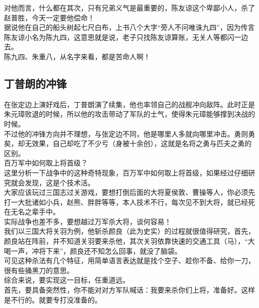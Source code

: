 \begin{multicols}{\theparacolNo}
对他而言，什么都在其次，只有兄弟义气是最重要的，陈友谅这个卑鄙小人，杀了赵普胜，今天一定要他偿命！\\

据说他在自己的船头树起七尺白布，上书八个大字“旁人不问唯诛九四”，因为传言陈友谅小名为陈九四，这意思就是说，老子只找陈友谅算账，无关人等都闪一边去。\\

陈九四、朱重八，从名字来看，都是苦命人啊！\\

\subsection{丁普朗的冲锋}
在张定边上演好戏后，丁普朗演了续集，他也率领自己的战舰冲向敌阵。此时正是朱元璋败退的时候，所以他的攻击带动了军队的士气，使得朱元璋能够撑到决战的时候。\\

不过他的冲锋方向并不理想，与张定边不同，他是哪里人多就向哪里冲击。勇则勇矣，却无效果，自己却吃了不少亏（身被十余创），这就是名将之勇与匹夫之勇的区别。\\

百万军中如何取上将首级？\\

这里分析一下战争中的这种奇特现象，百万军中如何取上将首级，如果经过仔细研究就会发现，这是个技术活。\\

大家应该玩过三国志过关游戏，要想打倒后面的大将夏侯敦、曹操等人，你必须先打一大批诸如小兵，赵熊、胖胖等等，本人技术不行，每次见不到大将，就已经死在无名之辈手中。\\

实际战争也差不多，要想越过万军杀大将，谈何容易！\\

我们以三国大将关羽为例，他斩杀颜良（此为史实）的过程就很值得研究，首先，颜良站在阵前，并不知道关羽要来杀他，其次关羽依靠快速的交通工具（马），“大喝一声，冲将下来”，颜良还不知怎么回事，就没了脑袋。\\

可见这种杀法有几个特征，用简单语言表达就是找个空子、趁你不备、给你一刀，很有些捅黑刀的意思。\\

综合来说，要实现这一目标，任重道远。\\

首先，要具备突然性，你不能对对方军队喊话：我要来杀你们上将，准备好。这样是不行的。就要专打没准备的。\\


\end{multicols}
